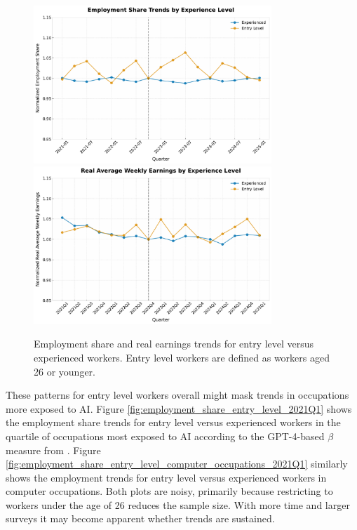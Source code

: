 \documentclass[12pt]{article}
\numberwithin{equation}{section}
\theoremstyle{theorem}\newcustomtheorem{theorem}{{\bf\sc Theorem}}
\theoremstyle{definition}\newcustomtheorem{assumption}{{\bf\sc Assumption}}
\theoremstyle{theorem} \newcustomtheorem{proposition}{{\bf\sc Proposition}}
\begin{document}
\begin{figure}[htbp]
	\centering
  \includegraphics[width=0.8\textwidth]{../figures/employment_share_entry_level_overall.pdf}
  \includegraphics[width=0.8\textwidth]{../figures/real_earnings_by_entry_level.pdf}
	\caption{Employment share and real earnings trends for entry level versus experienced workers. Entry level workers are defined as workers aged 26 or younger. }
	\label{fig:employment_share_entry_level_overall}
\end{figure}

These patterns for entry level workers overall might mask trends in occupations more exposed to AI. Figure \ref{fig:employment_share_entry_level_2021Q1} shows the employment share trends for entry level versus experienced workers in the quartile of occupations most exposed to AI according to the GPT-4-based $\beta$ measure from \citet{eloundou_gpts_2023}. Figure \ref{fig:employment_share_entry_level_computer_occupations_2021Q1} similarly shows the employment trends for entry level versus experienced workers in computer occupations. Both plots are noisy, primarily because restricting to workers under the age of 26 reduces the sample size. With more time and larger surveys it may become apparent whether trends are sustained. 
\end{document}
